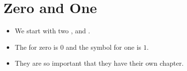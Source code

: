 \chapter{Zero and One}
\label{0and1}
\depends{}

\begin{itemize}
\item
We start with two ,  and .
\item
The  for zero is $0$ and the symbol for one is $1$.
\item
They are so important that they have their own chapter.
\end{itemize}
